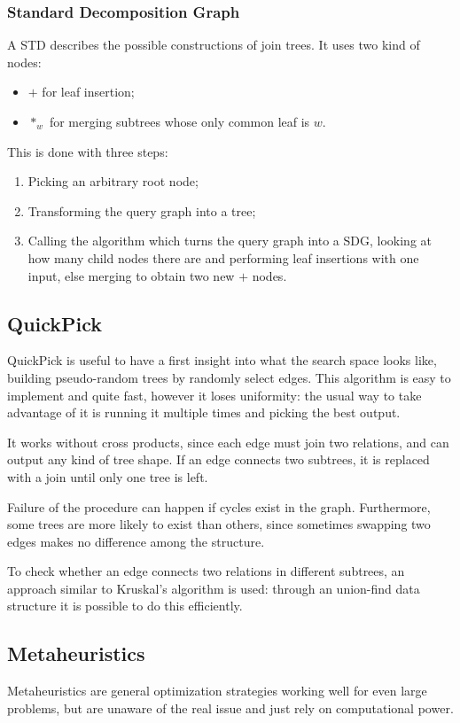 \subsubsection{Standard Decomposition Graph}
A STD describes the possible constructions of join trees. It uses two kind of nodes:
\begin{itemize}
	\item $+$ for leaf insertion;
	\item $*_w$ for merging subtrees whose only common leaf is $w$.
\end{itemize}
This is done with three steps:
\begin{enumerate}
	\item Picking an arbitrary root node;
	\item Transforming the query graph into a tree;
	\item Calling the algorithm which turns the query graph into a SDG, looking at how many child nodes there are and performing leaf insertions with one input, else merging to obtain two new $+$ nodes.
\end{enumerate}

\subsection{QuickPick}
QuickPick is useful to have a first insight into what the search space looks like, building pseudo-random trees by randomly select edges. This algorithm is easy to implement and quite fast, however it loses uniformity: the usual way to take advantage of it is running it multiple times and picking the best output.

It works without cross products, since each edge must join two relations, and can output any kind of tree shape. If an edge connects two subtrees, it is replaced with a join until only one tree is left. 

Failure of the procedure can happen if cycles exist in the graph. Furthermore, some trees are more likely to exist than others, since sometimes swapping two edges makes no difference among the structure.

To check whether an edge connects two relations in different subtrees, an approach similar to Kruskal's algorithm is used: through an union-find data structure it is possible to do this efficiently.

\subsection{Metaheuristics}
Metaheuristics are general optimization strategies working well for even large problems, but are unaware of the real issue and just rely on computational power.

